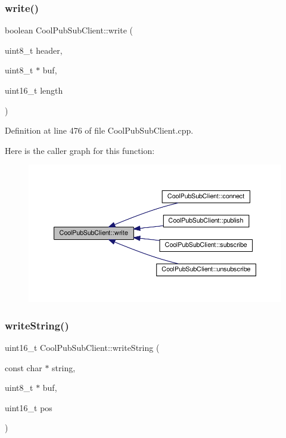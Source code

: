 \subsubsection{\texorpdfstring{write()}{write()}}
{\footnotesize\ttfamily boolean Cool\+Pub\+Sub\+Client\+::write (\begin{DoxyParamCaption}\item[{uint8\+\_\+t}]{header,  }\item[{uint8\+\_\+t $\ast$}]{buf,  }\item[{uint16\+\_\+t}]{length }\end{DoxyParamCaption})\hspace{0.3cm}{\ttfamily [private]}}



Definition at line 476 of file Cool\+Pub\+Sub\+Client.\+cpp.

Here is the caller graph for this function\+:
\nopagebreak
\begin{figure}[H]
\begin{center}
\leavevmode
\includegraphics[width=350pt]{class_cool_pub_sub_client_a7a8e4854a1846eaa668046d3854d47ad_icgraph}
\end{center}
\end{figure}
\mbox{\label{class_cool_pub_sub_client_a0e3d7e776d4cf4427f9569b28868905a}} 
\subsubsection{\texorpdfstring{write\+String()}{writeString()}}
{\footnotesize\ttfamily uint16\+\_\+t Cool\+Pub\+Sub\+Client\+::write\+String (\begin{DoxyParamCaption}\item[{const char $\ast$}]{string,  }\item[{uint8\+\_\+t $\ast$}]{buf,  }\item[{uint16\+\_\+t}]{pos }\end{DoxyParamCaption})\hspace{0.3cm}{\ttfamily [private]}}



